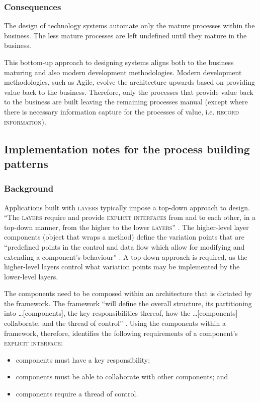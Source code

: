 \documentclass[prodmode]{style/acmlarge}
\begin{document}
\subsubsection*{Consequences} The design of technology systems automate only the
mature processes within the business.  The less mature processes are left
undefined until they mature in the business.

This bottom-up approach to designing systems aligns both to the business
maturing and also modern development methodologies.  Modern development
methodologies, such as Agile, evolve the architecture upwards based on providing
value back to the business.  Therefore, only the processes that provide value
back to the business are built leaving the remaining processes manual (except
where there is necessary information capture for the processes of value, i.e.
\textsc{record information}).



\subsection{Implementation notes for the process building patterns}

\subsubsection*{Background}

Applications built with \textsc{layers} typically impose a top-down approach to
design.  ``The \textsc{layers} require and provide \textsc{explicit interfaces}
from and to each other, in a top-down manner, from the higher to the lower
\textsc{layers}'' \cite[p. 11]{ioc}.  The higher-level layer components (object
that wraps a method) define the variation points that are
``predefined points in the control and data flow which allow for modifying and
extending a component's behaviour'' \cite[p. 5]{ioc}.  A top-down approach is
required, as the higher-level layers control what variation points may be
implemented by the lower-level layers.

The components need to be composed within an architecture that is dictated by
the framework.  The framework ``will define the overall structure, its
partitioning into \ldots [components], the key responsibilities thereof, how the
\ldots [components] collaborate, and the thread of control'' \cite[p.26]{gof}.
Using the components within a framework, therefore, identifies the following
requirements of a component's \textsc{explicit interface}:
\begin{itemize}
  \item components must have a key responsibility;
  \item components must be able to collaborate with other components; and
  \item components require a thread of control.
\end{itemize}
\end{document}
